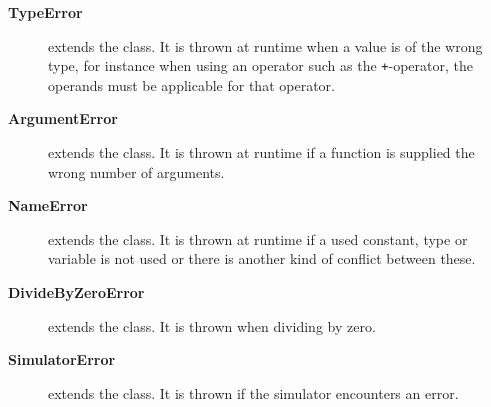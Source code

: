 \begin{description}
\item[\textbf{TypeError}] extends the  class. It is
  thrown at runtime when a value is of the wrong type, for instance when using
  an operator such as the \texttt{+}-operator, the operands must be applicable
  for that operator.

\item[\textbf{ArgumentError}] extends the  class. It is
  thrown at runtime if a function is supplied the wrong number of arguments.

\item[\textbf{NameError}] extends the  class. It is
  thrown at runtime if a used constant, type or variable is not used or there is
  another kind of conflict between these.

\item[\textbf{DivideByZeroError}] extends the  class. It
  is thrown when dividing by zero.

\item[\textbf{SimulatorError}] extends the  class. It is thrown
  if the simulator encounters an error.
\end{description}

